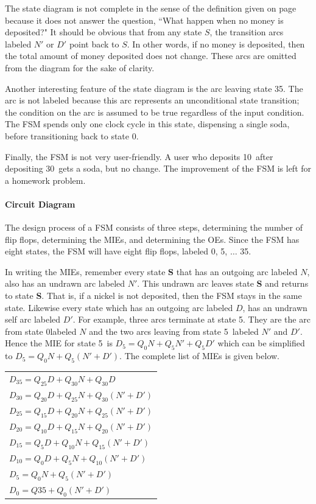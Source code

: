 The state diagram is not complete in the sense of the 
definition given on page~\pageref{page:completeness} because it does not
answer the question, ``What happen when no money is deposited?"
It should be obvious that from any state $S$, the transition
arcs labeled $N'$ or $D'$ point back to $S$.  In other words,
if no money is deposited, then the total amount of money
deposited does not change.  These arcs are omitted from the diagram for the
sake of clarity.  

Another interesting feature of the state diagram is the arc 
leaving state 35\textcent.  The arc is not labeled because 
this arc represents an unconditional state transition; the condition on
the arc is assumed to be true regardless of the input 
condition.  The FSM spends only one clock cycle in this
state, dispensing a single soda, before transitioning back to state
0\textcent.  

Finally, the FSM is not very user-friendly.  A user who deposits 
10\textcent~after depositing 30\textcent~gets a soda, but
no change.  The improvement of the FSM is left for a homework 
problem.  

\paragraph{Circuit Diagram}
The design process of a FSM consists of three steps, determining the 
number of flip flops, determining the MIEs, and determining the OEs.  
Since the FSM has eight states, the FSM will have eight flip flops, 
labeled 0\textcent, 5\textcent, $\ldots$ 35\textcent.  

In writing the MIEs, remember every state {\bf S} that has an outgoing 
arc labeled $N$, also has an undrawn arc labeled $N'$.  This undrawn 
arc leaves state {\bf S} and returns to state {\bf S}.  That is, if a nickel
is not deposited, then the FSM stays in the same state.  Likewise
every state which has an outgoing arc labeled $D$, has an undrawn self arc
labeled $D'$.  For example, three arcs terminate at state 5\textcent.
They are the arc from state 0\textcent labeled $N$ and the two arcs
leaving from state 5\textcent~labeled $N'$ and $D'$.  Hence the MIE
for state 5\textcent~is
$D_{5} = Q_{0}N + Q_{5}N' + Q_{5}D'$ which
can be simplified to 
$D_{5} = Q_{0}N + Q_{5}(N' + D')$.  The complete
list of MIEs is given below.


\begin{tabular}{l}

$D_{35} = Q_{25}D + Q_{30}N + Q_{30}D$ \\
$D_{30} = Q_{20}D + Q_{25}N + Q_{30}(N'+D')$ \\
$D_{25} = Q_{15}D + Q_{20}N + Q_{25}(N'+D')$ \\
$D_{20} = Q_{10}D + Q_{15}N + Q_{20}(N'+D')$ \\
$D_{15} = Q_{5}D +  Q_{10}N + Q_{15}(N'+D')$ \\
$D_{10} = Q_{0}D +  Q_{5}N  + Q_{10}(N'+D')$ \\
$D_{5}  =           Q_{0}N  + Q_{5}(N'+D')$ \\
$D_{0}  = Q{35} + Q_{0}(N'+D')$ \\

\end{tabular}

